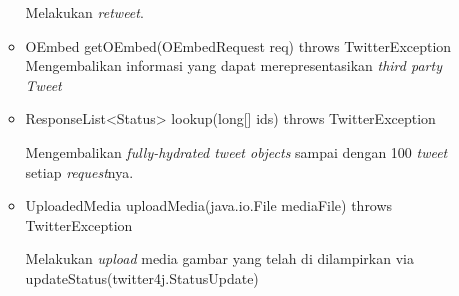 \begin{itemize}
\begin{itemize}
			Melakukan \textit{retweet}.
			\item OEmbed getOEmbed(OEmbedRequest req) throws TwitterException
			Mengembalikan informasi yang dapat merepresentasikan \textit{third party} \textit{Tweet}
			
			\item ResponseList<Status> lookup(long[] ids) throws TwitterException
			
			Mengembalikan \textit{fully-hydrated tweet objects} sampai dengan 100 \textit{tweet} setiap \textit{request}nya.
			\item UploadedMedia uploadMedia(java.io.File mediaFile) throws TwitterException
			
			Melakukan \textit{upload} media gambar yang telah di dilampirkan via updateStatus(twitter4j.StatusUpdate)
		\end{itemize}
	\end{itemize}

